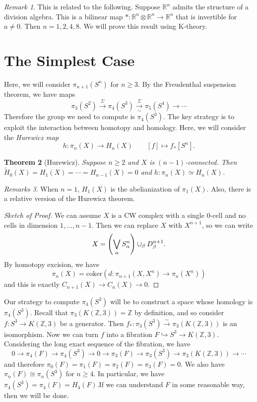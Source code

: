 \documentclass[leqno, openany]{memoir}
\newtheorem{thm}{Theorem}[section]
\theoremstyle{definition}
\theoremstyle{remark}
\newtheorem{rmk}[thm]{Remark}
\newtheorem{rmks}[thm]{Remarks}
\theoremstyle{plain}
\theoremstyle{definition}
\theoremstyle{remark}
\newcommand{\R}{\mathbb{R}}
\newcommand{\Z}{\mathbb{Z}}
\newcommand{\mr}[1]{\mathrm{#1}}
\newcommand{\wt}[1]{\widetilde{#1}}
\begin{document}
\begin{rmk} This is related to the following. Suppose $\R^n$ admits the
    structure of a division algebra. This is a bilinear map $* \colon \R^n
    \otimes \R^n \to \R^n$ that is invertible for $a \neq 0$. Then $n =
    1,2,4,8$. We will prove this result using K-theory.  \end{rmk}

\section{The Simplest Case}%

Here, we will consider $\pi_{n+1}(S^n)$ for $n \geq 3$. By the Freudenthal
suspension theorem, we have maps \[ \pi_3(S^2) \xrightarrow{\Sigma} \pi_4(S^3)
\xrightarrow[\sim]{\Sigma} \pi_5(S^4) \to \cdots \] Therefore the group we need
to compute is $\pi_4(S^3)$. The key strategy is to exploit the interaction
between homotopy and homology. Here, we will consider the \textit{Hurewicz map}
\[ h \colon \pi_n(X) \to H_n(X) \qquad [f] \mapsto f_* [S^n]. \]

\begin{thm}[Hurewicz] Suppose $n \geq 2$ and $X$ is $(n-1)$-connected. Then
$\wt{H}_0(X) = H_1(X) = \cdots = H_{n-1}(X) = 0$ and $h \colon \pi_n(X) \simeq
H_n(X)$.  \end{thm}

\begin{rmks} When $n = 1$, $H_1(X)$ is the abelianization of $\pi_1(X)$. Also,
there is a relative version of the Hurewicz theorem.  \end{rmks}

\begin{proof}[Sketch of Proof] We can assume $X$ is a CW complex with a single
    $0$-cell and no cells in dimension $1, \ldots, n-1$. Then we can replace
    $X$ with $X^{n+1}$, so we can write \[ X = \qty( \bigvee_{\alpha}
    S_{\alpha}^n ) \cup_{\beta} D_{\beta}^{n+1}. \] By homotopy excision, we
    have \[ \pi_n(X) = \mr{coker}(d \colon \pi_{n+1}(X, X^n) \to \pi_n(X^n)) \]
and this is exactly $C_{n+1}(X) \to C_n(X) \to 0$.  \end{proof}

Our strategy to compute $\pi_4(S^3)$ will be to construct a space whose
homology is $\pi_4(S^3)$. Recall that $\pi_3(K(\Z, 3)) = \Z$ by definition, and
so consider $f \colon S^3 \to K(\Z, 3)$ be a generator. Then $f_* \colon
\pi_3(S^3) \xrightarrow{\sim} \pi_3(K(\Z, 3))$ is an isomorphism. Now we can
turn $f$ into a fibration $F \hookrightarrow S^3 \to K(\Z, 3)$. Considering the
long exact sequence of the fibration, we have \[ 0 \to \pi_4(F) \to \pi_4(S^3)
\to 0 \to \pi_3(F) \to \pi_3(S^3) \to \pi_3(K(\Z, 3)) \to \cdots \] and
therefore $\pi_0(F) = \pi_1(F) = \pi_2(F) = \pi_3(F) = 0$. We also have
$\pi_n(F) \cong \pi_n(S^3)$ for $n \geq 4$. In particular, we have $\pi_4(S^3)
= \pi_4(F) = H_4(F)$.If we can understand $F$ in some reasonable way, then we
will be done.
\end{document}
